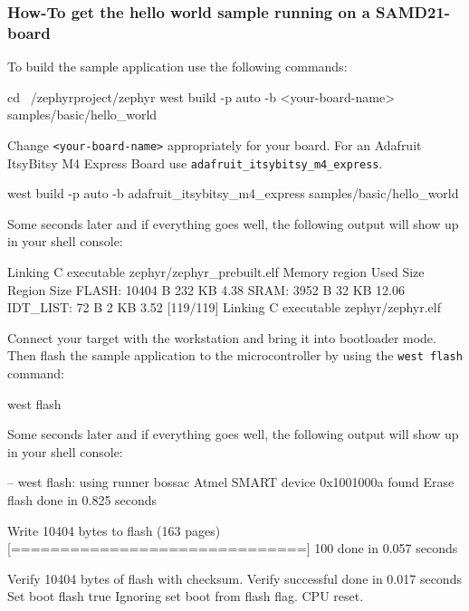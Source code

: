 

\subsubsection{How-To get the hello world sample running on a SAMD21-board}

To build the sample application use the following commands:

\begin{bashbox}
cd ~/zephyrproject/zephyr
west build -p auto -b <your-board-name> samples/basic/hello_world
\end{bashbox}

Change \texttt{<your-board-name>} appropriately for your board. For an Adafruit ItsyBitsy M4 Express Board use \texttt{adafruit_itsybitsy_m4_express}.


\begin{bashbox}
west build -p auto -b adafruit_itsybitsy_m4_express samples/basic/hello_world
\end{bashbox}


Some seconds later and if everything goes well, the following output will show up in your shell console:

\begin{textbox}
[114/119] Linking C executable zephyr/zephyr_prebuilt.elf
Memory region         Used Size  Region Size  %
           FLASH:       10404 B       232 KB      4.38%
            SRAM:        3952 B        32 KB     12.06%
        IDT_LIST:          72 B         2 KB      3.52%
[119/119] Linking C executable zephyr/zephyr.elf
\end{textbox}


Connect your target with the workstation and bring it into bootloader mode. Then flash the sample application to the microcontroller by using the \texttt{west flash} command:

\begin{bashbox}
west flash
\end{bashbox}

Some seconds later and if everything goes well, the following output will show up in your shell console:

\begin{textbox}
-- west flash: using runner bossac
Atmel SMART device 0x1001000a found
Erase flash
done in 0.825 seconds

Write 10404 bytes to flash (163 pages)
[==============================] 100%
done in 0.057 seconds

Verify 10404 bytes of flash with checksum.
Verify successful
done in 0.017 seconds
Set boot flash true
Ignoring set boot from flash flag.
CPU reset.
\end{textbox}


